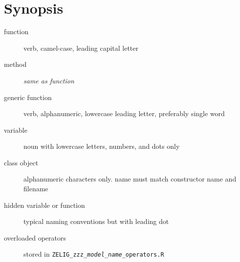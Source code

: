 \documentclass[a4paper,10pt]{article}
\begin{document}
\section{Synopsis}

\begin{description}
	\item[function]{verb, camel-case, leading capital letter}
	\item[method]{\emph{same as function}}
	\item[generic function]{verb, alphanumeric, lowercase leading letter, preferably single word}
	\item[variable]{noun with lowercase letters, numbers, and dots only}
	\item[class object]{alphanumeric characters only.  name must match constructor name and filename}
	\item[hidden variable or function]{typical naming conventions but with leading dot}
	\item[overloaded operators]{stored in {\tt ZELIG\_zzz\_\emph{model\_name}\_operators.R}}
\end{description}
\end{document}
